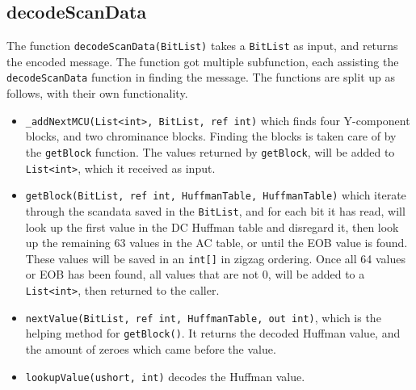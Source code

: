 \subsection{decodeScanData}
The function \lstinline|decodeScanData(BitList)| takes a \lstinline|BitList| as input, and returns the encoded message.
The function got multiple subfunction, each assisting the \lstinline|decodeScanData| function in finding the message. The functions are split up as follows, with their own functionality.
\begin{itemize}
	\item \lstinline|_addNextMCU(List<int>, BitList, ref int)| which finds four Y-component blocks, and two chrominance blocks. Finding the blocks is taken care of by the \lstinline|getBlock| function. The values returned by \lstinline|getBlock|, will be added to \lstinline|List<int>|, which it received as input.
	\item \lstinline|getBlock(BitList, ref int, HuffmanTable, HuffmanTable)| which iterate through the scandata saved in the \lstinline|BitList|, and for each bit it has read, will look up the first value in the DC Huffman table and disregard it, then look up the remaining 63 values in the AC table, or until the EOB value is found.
	These values will be saved in an \lstinline|int[]| in zigzag ordering.
	Once all 64 values or EOB has been found, all values that are not 0, will be added to a \lstinline|List<int>|, then returned to the caller.
	\item \lstinline|nextValue(BitList, ref int, HuffmanTable, out int)|, which is the helping method for \lstinline|getBlock()|. It returns the decoded Huffman value, and the amount of zeroes which came before the value.
	\item \lstinline|lookupValue(ushort, int)| decodes the Huffman value.
\end{itemize}


